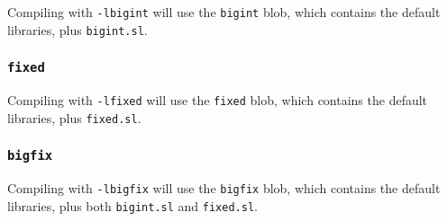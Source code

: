 \documentclass[twocolumn]{article}
\begin{document}
Compiling with \texttt{-lbigint} will use the \texttt{bigint} blob, which
contains the default libraries, plus \texttt{bigint.sl}.

\subsubsection{\texttt{fixed}}

Compiling with \texttt{-lfixed} will use the \texttt{fixed} blob, which
contains the default libraries, plus \texttt{fixed.sl}.

\subsubsection{\texttt{bigfix}}

Compiling with \texttt{-lbigfix} will use the \texttt{bigfix} blob, which
contains the default libraries, plus both \texttt{bigint.sl} and \texttt{fixed.sl}.

\printindex
\end{document}
